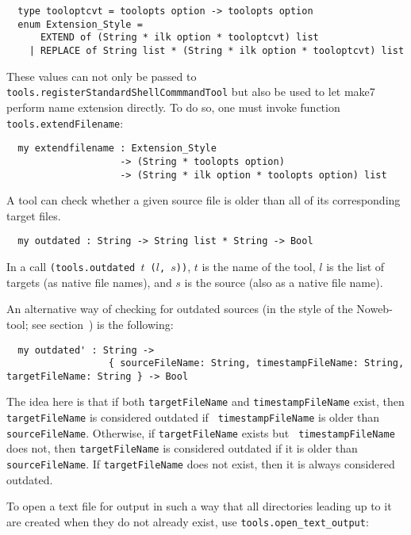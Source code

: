\begin{verbatim}
  type tooloptcvt = toolopts option -> toolopts option
  enum Extension_Style =
      EXTEND of (String * ilk option * tooloptcvt) list
    | REPLACE of String list * (String * ilk option * tooloptcvt) list
\end{verbatim}

These values can not only be passed to {\tt
tools.registerStandardShellCommmandTool} but also be used to let make7 perform name
extension directly.  To do so, one must invoke function {\tt
tools.extendFilename}:

\begin{verbatim}
  my extendfilename : Extension_Style
                    -> (String * toolopts option)
                    -> (String * ilk option * toolopts option) list
\end{verbatim}

 A tool can check whether a given
source file is older than all of its corresponding target files.

\begin{verbatim}
  my outdated : String -> String list * String -> Bool
\end{verbatim}

In a call {\tt (tools.outdated $t$ ($l$, $s$))}, $t$ is the name of
the tool, $l$ is the list of targets (as native file names),
and $s$ is the source (also as a native file name).

An alternative way of checking for outdated sources (in the style of
the Noweb-tool; see section~) is the
following:

\begin{verbatim}
  my outdated' : String ->
                  { sourceFileName: String, timestampFileName: String, targetFileName: String } -> Bool
\end{verbatim}

The idea here is that if both {\tt targetFileName} and {\tt timestampFileName}
exist, then {\tt targetFileName} is considered outdated if {\tt
timestampFileName} is older than {\tt sourceFileName}.
Otherwise, if {\tt targetFileName} exists but {\tt
timestampFileName} does not, then {\tt targetFileName} is considered
outdated if it is older than {\tt sourceFileName}.
If {\tt targetFileName} does not exist, then it is always
considered outdated.

  To open a text file for
output in such a way that all directories leading up to it are created
when they do not already exist, use {\tt tools.open_text_output}:

